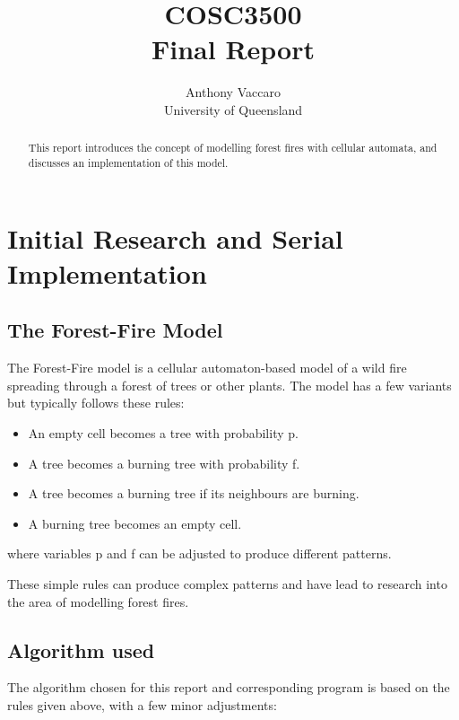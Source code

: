 \documentclass[11pt,a4paper]{report}
\begin{document}
\title{COSC3500\\Final Report}
\author{Anthony Vaccaro\\University of Queensland}

\maketitle
\begin{abstract}
This report introduces the concept of modelling forest fires with cellular
automata, and discusses an implementation of this model.
\end{abstract}

\newpage
\tableofcontents
\newpage

\chapter{Initial Research and Serial Implementation}

\newpage
\section{The Forest-Fire Model}

The Forest-Fire model is a cellular automaton-based model of a wild fire
spreading through a forest of trees or other plants. The model has a few
variants but typically follows these rules:\\

\begin{itemize}
\item An empty cell becomes a tree with probability p.
\item A tree becomes a burning tree with probability f.
\item A tree becomes a burning tree if its neighbours are burning.
\item A burning tree becomes an empty cell.
\end{itemize}
where variables p and f can be adjusted to produce different patterns.

These simple rules can produce complex patterns and have lead to research
into the area of modelling forest fires.

\newpage
\section{Algorithm used}

The algorithm chosen for this report and corresponding program is based on the
rules given above, with a few minor adjustments:\\
\end{document}
